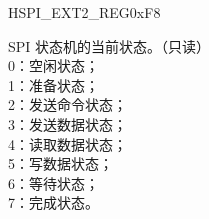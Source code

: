 \begin{register}{H}{SPI\_EXT2\_REG}{0xF8}\label{regdesc:SPIEXT2REG}
%
%
\regnewline%
\begin{regdesc}\begin{reglist}
\item [SPI\_ST] SPI 状态机的当前状态。（只读） \\
0：空闲状态；\\
1：准备状态；\\
2：发送命令状态；\\
3：发送数据状态；\\
4：读取数据状态；\\
5：写数据状态；\\
6：等待状态；\\
7：完成状态。\\
\end{reglist}\end{regdesc}
\end{register}


